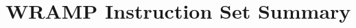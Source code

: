 \documentclass[a4paper,10pt]{article}
\begin{document}
\newcommand{\arithmeticinsn}[1]
	   { \scriptsize{$ \regdsm \leftarrow \regssm #1 \regtsm $ } }
\newcommand{\arithmeticinsni}[1]
           { \scriptsize{$ \regdsm \leftarrow \regssm #1 \signextend(immed) $ }
	   }
\newcommand{\arithmeticinsnu}[1]
           { \scriptsize{$ \regdsm \leftarrow \regssm #1 \regtsm $ } }
\newcommand{\arithmeticinsnui}[1]
           { \scriptsize{$ \regdsm \leftarrow \regssm #1 immed $ } }
\newcommand{\lhiinsn}
           { \scriptsize{$ \regdsm \leftarrow immed \ll 16 $} }
\newcommand{\lainsn}
           { \scriptsize{$ \regdsm \leftarrow address $} }
\newcommand{\srainsn}
           { \scriptsize{$ \regdsm \leftarrow \signextend( \regssm\ \gg\ \regtsm\ ) $ } }
\newcommand{\srainsnimm}
           { \scriptsize{$ \regdsm \leftarrow \signextend( \regssm\ \gg\ immed\ ) $ } }
\newcommand{\jumpinsn}[1]
           { \scriptsize{$ PC \leftarrow #1 $} }
\newcommand{\jalinsn}[1]
           { \scriptsize{$ \texttt{\$ra} \leftarrow PC,\ PC \leftarrow #1 $} } 
\newcommand{\specialinsn}[1]
           { \scriptsize{ $ #1 $ } }
\newcommand{\branchinsn}[1]
           { \scriptsize{ $ if(\regssm\ #1\ 0)\ PC\ \leftarrow\ PC + offset $}}
\newcommand{\lwinsn}
           { \scriptsize{ $ \regdsm\ \leftarrow\ MEM[\regssm + offset] $}}
\newcommand{\swinsn}
           { \scriptsize{ $ MEM[\regssm + offset]\ \leftarrow\ \regdsm $}}

\newpage

\section{WRAMP Instruction Set Summary}
\end{document}
